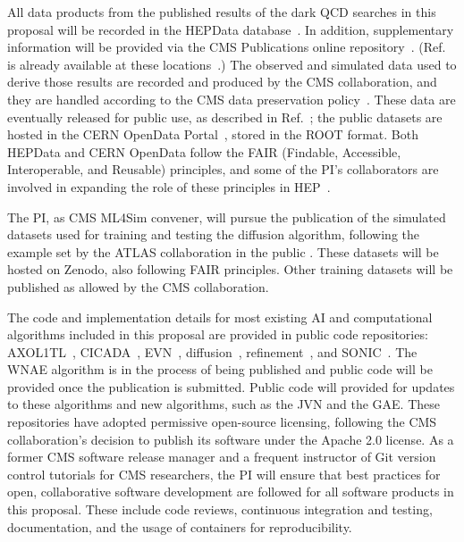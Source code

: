 All data products from the published results of the dark QCD searches in this proposal will be recorded in the HEPData database~\cite{Maguire:2017ypu}.
In addition, supplementary information will be provided via the CMS Publications online repository~\cite{cmspub}.
(Ref.~\cite{CMS:2021dzg} is already available at these locations~\cite{hepdata,EXO-19-020}.)
The observed and simulated data used to derive those results are recorded and produced by the CMS collaboration,
and they are handled according to the CMS data preservation policy~\cite{cmsdata}.
These data are eventually released for public use, as described in Ref.~\cite{cmsdata};
the public datasets are hosted in the CERN OpenData Portal~\cite{opendata}, stored in the ROOT format.
Both HEPData and CERN OpenData follow the FAIR (Findable, Accessible, Interoperable, and Reusable) principles,
and some of the PI's collaborators are involved in expanding the role of these principles in HEP~\cite{FAIR4HEP}.

The PI, as CMS ML4Sim convener, will pursue the publication of the simulated datasets used for training and testing the diffusion algorithm,
following the example set by the ATLAS collaboration in the public \challenge.
These datasets will be hosted on Zenodo, also following FAIR principles.
Other training datasets will be published as allowed by the CMS collaboration.

The code and implementation details for most existing AI and computational algorithms included in this proposal are provided in public code repositories:
AXOL1TL~\cite{AXOL1TL:repo}, CICADA~\cite{CICADA:repo}, EVN~\cite{EVN:repo}, diffusion~\cite{CaloDiffusion:repo}, refinement~\cite{Refinement:repo}, and SONIC~\cite{SONIC:repo}.
The WNAE algorithm is in the process of being published and public code will be provided once the publication is submitted.
Public code will provided for updates to these algorithms and new algorithms, such as the JVN and the GAE.
These repositories have adopted permissive open-source licensing, following the CMS collaboration's decision to publish its software under the Apache 2.0 license.
As a former CMS software release manager and a frequent instructor of Git version control tutorials for CMS researchers,
the PI will ensure that best practices for open, collaborative software development are followed for all software products in this proposal.
These include code reviews, continuous integration and testing, documentation, and the usage of containers for reproducibility.
